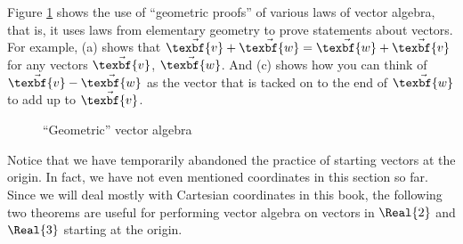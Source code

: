 Figure \ref{fig:pgram} shows the use of ``geometric proofs'' of various laws of vector algebra, that is, it
uses laws from elementary geometry to prove statements about vectors.
For example, (a) shows that $\vec{\texbf{v}} + \vec{\texbf{w}} = \vec{\texbf{w}} + \vec{\texbf{v}}$ for any vectors $\vec{\texbf{v}}$,
$\vec{\texbf{w}}$. And (c) shows how you can think of $\vec{\texbf{v}} - \vec{\texbf{w}}$ as the vector that is tacked on to the end of
$\vec{\texbf{w}}$ to add up to $\vec{\texbf{v}}$.

\begin{figure}[h]
 \centering
 \qquad
 \qquad
 \caption[]{\quad ``Geometric'' vector algebra}
 \label{fig:pgram}
\end{figure}

Notice that we have temporarily abandoned the practice of starting vectors at the origin. In fact, we have not even
mentioned coordinates in this section so far. Since we will deal mostly with Cartesian coordinates in this book, the
following two theorems are useful for performing vector algebra on vectors in $\Real{2}$ and $\Real{3}$
starting at the origin.

